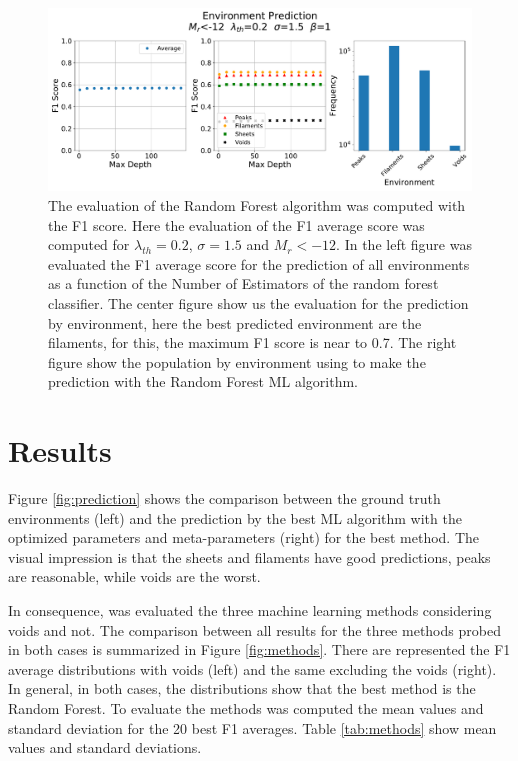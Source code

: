 \documentclass[usenatbib]{mnras}
\begin{document}
\begin{figure}
    \includegraphics[scale=0.45]{Figs/p_F1_curve_Forest.pdf}
    \caption{The evaluation of the Random Forest algorithm was computed with the F1 score. Here the evaluation of the F1 average score  was computed for $\lambda_{th}=0.2$, $\sigma=1.5$ and $M_r<-12$.  In the left figure was evaluated the F1 average score for the prediction of all environments as a function of the Number of Estimators of the random forest classifier. The center figure show us the evaluation for the prediction by environment, here the best predicted environment are the filaments, for this, the maximum F1 score is near to 0.7. The right figure show the population by environment using to make the prediction with the Random Forest ML algorithm.}
    \label{fig:F1_curve}
\end{figure}

\section{Results}\label{sec:results}

Figure \ref{fig:prediction} shows the comparison between the ground truth environments (left) and the prediction by the best ML algorithm with the optimized parameters and meta-parameters (right) for the best method.
The visual impression is that the sheets and filaments have good predictions,
peaks are reasonable, while voids are the worst.

In consequence, was evaluated the three machine learning methods considering voids and not.
The comparison between all results for the three methods probed in both cases is summarized in Figure \ref{fig:methods}. 
There are represented the F1 average distributions with voids (left) and the same excluding the voids (right). 
In general, in both cases, the distributions show that the best method is the Random Forest. 
To evaluate the methods was computed the mean values and standard deviation for the 20 best F1 averages. Table \ref{tab:methods} show mean values and standard deviations.
\end{document}
